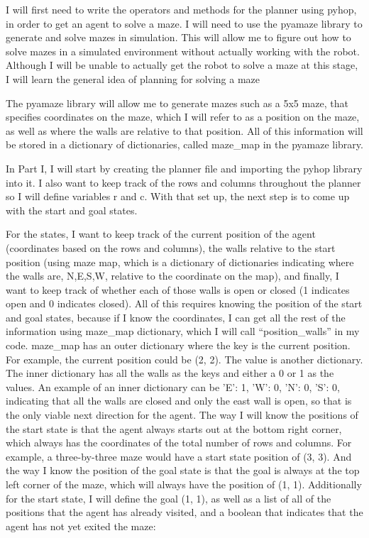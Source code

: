 \documentclass[10pt,twocolumn]{article}
\begin{document}
I will first need to write the operators and methods for the planner using pyhop, in order to get an agent to solve a maze. I will need to use the pyamaze library to generate and solve mazes in simulation. This will allow me to figure out how to solve mazes in a simulated environment without actually working with the robot. Although I will be unable to actually get the robot to solve a maze at this stage, I will learn the general idea of planning for solving a maze

The pyamaze library will allow me to generate mazes such as a 5x5 maze, that specifies coordinates on the maze, which I will refer to as a position on the maze, as well as where the walls are relative to that position. All of this information will be stored in a dictionary of dictionaries, called maze\_map in the pyamaze library.

In Part I, I will start by creating the planner file and importing the pyhop library into it. I also want to keep track of the rows and columns throughout the planner so I will define variables r and c. With that set up, the next step is to come up with the start and goal states.

For the states, I want to keep track of the current position of the agent (coordinates based on the rows and columns), the walls relative to the start position (using maze map, which is a dictionary of dictionaries indicating where the walls are, N,E,S,W, relative to the coordinate on the map), and finally, I want to keep track of whether each of those walls is open or closed (1 indicates open and 0 indicates closed). All of this requires knowing the position of the start and goal states, because if I know the coordinates, I can get all the rest of the information using maze\_map dictionary, which I will call “position\_walls'' in my code. maze\_map has an outer dictionary where the key is the current position. For example, the current position could be (2, 2). The value is another dictionary. The inner dictionary has all the walls as the keys and either a 0 or 1 as the values. An example of an inner dictionary can be {'E': 1, 'W': 0, 'N': 0, 'S': 0}, indicating that all the walls are closed and only the east wall is open, so that is the only viable next direction for the agent. The way I will know the positions of the start state is that the agent always starts out at the bottom right corner, which always has the coordinates of the total number of rows and columns. For example, a three-by-three maze would have a start state position of (3, 3). And the way I know the position of the goal state is that the goal is always at the top left corner of the maze, which will always have the position of (1, 1). Additionally for the start state, I will define the goal (1, 1), as well as a list of all of the positions that the agent has already visited, and a boolean that indicates that the agent has not yet exited the maze:
\end{document}
